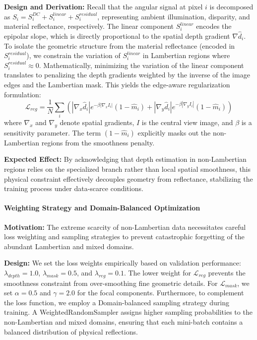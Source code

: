 \documentclass[lettersize,journal]{IEEEtran}
\begin{document}
\textbf{Design and Derivation:} Recall that the angular signal at pixel $i$ is decomposed as $S_i = S_i^{DC} + S_i^{linear} + S_i^{residual}$, representing ambient illumination, disparity, and material reflectance, respectively. The linear component $S_i^{linear}$ encodes the epipolar slope, which is directly proportional to the spatial depth gradient $\nabla \hat{d}_i$. To isolate the geometric structure from the material reflectance (encoded in $S_i^{residual}$), we constrain the variation of $S_i^{linear}$ in Lambertian regions where $S_i^{residual} \approx 0$. Mathematically, minimizing the variation of the linear component translates to penalizing the depth gradients weighted by the inverse of the image edges and the Lambertian mask. This yields the edge-aware regularization formulation:
\begin{equation} \label{eq:ch3_22}
\mathcal{L}_{reg} = \frac{1}{N} \sum_{i} \left( |\nabla_x \hat{d}_i| e^{-\beta |\nabla_x I_i|} (1 - \hat{m}_i) + |\nabla_y \hat{d}_i| e^{-\beta |\nabla_y I_i|} (1 - \hat{m}_i) \right)
\end{equation}
where $\nabla_x$ and $\nabla_y$ denote spatial gradients, $I$ is the central view image, and $\beta$ is a sensitivity parameter. The term $(1 - \hat{m}_i)$ explicitly masks out the non-Lambertian regions from the smoothness penalty.

\textbf{Expected Effect:} By acknowledging that depth estimation in non-Lambertian regions relies on the specialized branch rather than local spatial smoothness, this physical constraint effectively decouples geometry from reflectance, stabilizing the training process under data-scarce conditions.

\paragraph{Weighting Strategy and Domain-Balanced Optimization}
\textbf{Motivation:} The extreme scarcity of non-Lambertian data necessitates careful loss weighting and sampling strategies to prevent catastrophic forgetting of the abundant Lambertian and mixed domains.

\textbf{Design:} We set the loss weights empirically based on validation performance: $\lambda_{depth} = 1.0$, $\lambda_{mask} = 0.5$, and $\lambda_{reg} = 0.1$. The lower weight for $\mathcal{L}_{reg}$ prevents the smoothness constraint from over-smoothing fine geometric details. For $\mathcal{L}_{mask}$, we set $\alpha = 0.5$ and $\gamma = 2.0$ for the focal components. Furthermore, to complement the loss function, we employ a Domain-balanced sampling strategy during training. A WeightedRandomSampler assigns higher sampling probabilities to the non-Lambertian and mixed domains, ensuring that each mini-batch contains a balanced distribution of physical reflections. 
\end{document}
